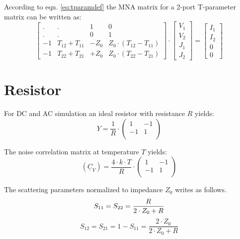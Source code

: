 According to eqn. \eqref{eq:tparamdef} the MNA matrix for a 2-port
T-parameter matrix can be written as:
\begin{equation}
\begin{bmatrix}
 . & .  &  1 & 0\\
 . & .  &  0 & 1\\
  -1 & T_{12}+T_{11} & -Z_0 & Z_0\cdot (T_{12}-T_{11})\\
  -1 & T_{22}+T_{21} & +Z_0 & Z_0\cdot (T_{22}-T_{21})
\end{bmatrix}
\cdot
\begin{bmatrix}
V_{1}\\
V_{2}\\
J_{1}\\
J_{2}
\end{bmatrix}
=
\begin{bmatrix}
I_{1}\\
I_{2}\\
0\\
0
\end{bmatrix}
\end{equation}

\section{Resistor}

For DC and AC simulation an ideal resistor with resistance $R$
yields:
\begin{equation}
Y = \dfrac{1}{R} \cdot
\begin{pmatrix}
 1 & -1 \\
-1 &  1 \\
\end{pmatrix}
\end{equation}

The noise correlation matrix at temperature $T$ yields:
\begin{equation}
(\underline{C}_Y) = \frac{4\cdot k\cdot T}{R} \cdot
\begin{pmatrix}
 1 & -1 \\
-1 &  1 \\
\end{pmatrix}
\end{equation}

The scattering parameters normalized to impedance $Z_0$
writes as follows.
\begin{equation}
S_{11} = S_{22} = \frac{R}{2\cdot Z_0+R} \\
\end{equation}
\begin{equation}
S_{12} = S_{21} = 1-S_{11} = \frac{2\cdot Z_0}{2\cdot Z_0+R}
\end{equation}

